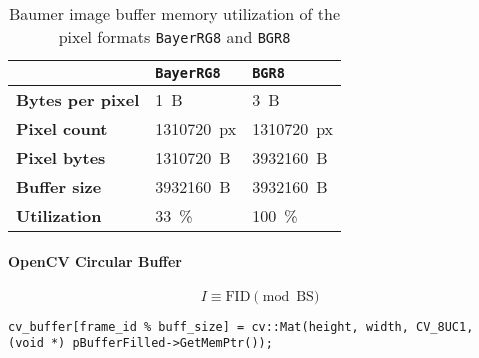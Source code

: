 \begin{table}[h]
  \caption{Baumer image buffer memory utilization of the pixel formats \texttt{BayerRG8} and \texttt{BGR8}}
  \label{tab:buffer_memory_utilization}
  \centering
  \begin{tabular}{lll}
    \toprule
     & \textbf{\texttt{BayerRG8}} & \textbf{\texttt{BGR8}} \\
    \midrule
    \textbf{Bytes per pixel} & \SI{1}{B} & \SI{3}{B} \\
    \textbf{Pixel count} & \SI{1310720}{px} & \SI{1310720}{px} \\
    \textbf{Pixel bytes} & \SI{1310720}{B} & \SI{3932160}{B} \\
    \textbf{Buffer size} & \SI{3932160}{B} & \SI{3932160}{B} \\
    \textbf{Utilization} & \SI{33}{\percent} & \SI{100}{\percent} \\
    \bottomrule
  \end{tabular}
\end{table}

\paragraph{OpenCV Circular Buffer}





\begin{equation}
  I \equiv \text{FID} \pmod{\text{BS}}
  \label{eq:indexing}
\end{equation}

\begin{lstlisting}[style=C++]
  cv_buffer[frame_id % buff_size] = cv::Mat(height, width, CV_8UC1, (void *) pBufferFilled->GetMemPtr());
\end{lstlisting}
